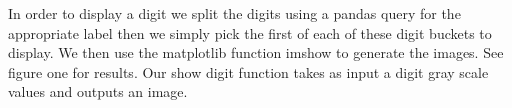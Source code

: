 \documentclass[12pt]{report}
\begin{document}
In order to display a digit we split the digits using a pandas query for the appropriate label then we simply pick the first of each of these digit buckets to display. We then use the matplotlib function imshow to generate the images. See figure one for results. Our show digit function takes as input a digit gray scale values and outputs an image.
\begin{figure}
\centering
{}


\end{figure}
\end{document}
